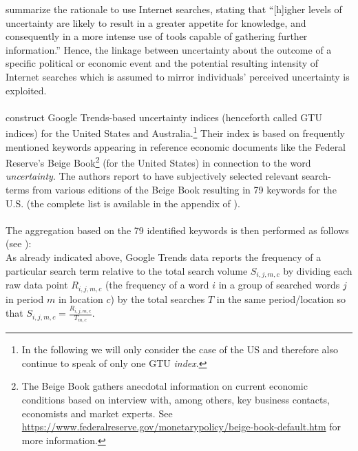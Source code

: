 \documentclass[a4paper,12pt,oneside,pointednumbers,bibtotoc,bigheadings,liststotoc]{scrbook}
\begin{document}
\citet[p. 3]{bontempietal:16} summarize the rationale to use Internet searches, stating that ``[h]igher levels of uncertainty are likely to result in a greater appetite for knowledge, and consequently in a more intense use of tools capable of gathering further information.'' Hence, the linkage between uncertainty about the outcome of a specific political or economic event and the potential resulting intensity of Internet searches which is assumed to mirror individuals' perceived uncertainty is exploited. \\
\\
\citet{castelnuovoandtran:17} construct Google Trends-based uncertainty indices (henceforth called GTU indices) for the United States and Australia.\footnote{In the following we will only consider the case of the US and therefore also continue to speak of only one GTU \textit{index}.} Their index is based on frequently mentioned keywords appearing in reference economic documents like the Federal Reserve's Beige Book\footnote{The Beige Book gathers anecdotal information on current economic conditions based on interview with, among others, key business contacts, economists and market experts. See \url{https://www.federalreserve.gov/monetarypolicy/beige-book-default.htm} for more information.} (for the United States) in connection to the word \textit{uncertainty}. The authors report to have subjectively selected relevant search-terms from various editions of the Beige Book resulting in 79 keywords for the U.S. (the complete list is available in the appendix of \citealp{castelnuovoandtran:17}). \\
\\
The aggregation based on the 79 identified keywords is then performed as follows (see \citet{castelnuovoandtran:17}): \\
As already indicated above, Google Trends data reports the frequency of a particular search term relative to the total search volume $S_{i, j, m, c}$ by dividing each raw data point $R_{i, j, m, c}$ (the frequency of a word $i$ in a group of searched words $j$ in period $m$ in location $c$) by the total searches $T$ in the same period/location so that $S_{i, j, m, c} = \frac{R_{i, j, m, c}}{T_{m, c}}$. 
\end{document}
